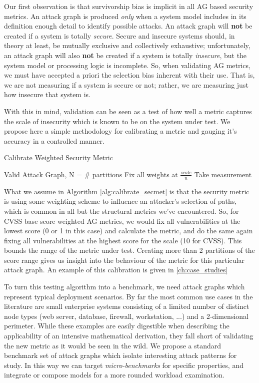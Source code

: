 Our first observation is that survivorship bias\cite{Wald_1980} is implicit in all AG based security metrics. An attack graph is produced \textit{only} when a system model includes in its definition enough detail to identify possible attacks. An attack graph will \textbf{not} be created if a system is totally \textit{secure}. Secure and insecure systems should, in theory at least, be mutually exclusive and collectively exhaustive; unfortunately, an attack graph will also \textbf{not} be created if a system is totally \textit{insecure}, but the system model or processing logic is incomplete. So, when validating AG metrics, we must have accepted a priori the selection bias inherent with their use. That is, we are not measuring if a system is secure or not; rather, we are measuring just how insecure that system is. 

With this in mind, validation can be seen as a test of how well a metric captures the scale of insecurity which is known to be on the system under test. We propose here a simple methodology for calibrating a metric and gauging it's accuracy in a controlled manner. 

\begin{algorithm}
\caption{Calibrate Weighted Security Metric}
\label{alg:calibrate_secmet}
\begin{algorithmic}
\REQUIRE Valid Attack Graph, N = \# partitions
 \STATE Fix all weights at $\frac{scale}{n}$ 
 \STATE Take measurement
\ENDFOR
 \end{algorithmic}
\end{algorithm}

What we assume in Algorithm \ref{alg:calibrate_secmet} is that the security metric is using some weighting scheme to influence an attacker's selection of paths, which is common in all but the structural metrics  we've encountered. So, for CVSS base score weighted AG metrics, we would fix all vulnerabilities at the lowest score (0 or 1 in this case) and calculate the metric, and do the same again fixing all vulnerabilities at the highest score for the scale (10 for CVSS). This bounds the range of the metric under test. Creating more than 2 partitions of the score range gives us insight into the behaviour of the metric for this particular attack graph. An example of this calibration is given in \ref{ch:case_studies}

To turn this testing algorithm into a benchmark, we need attack graphs which represent typical deployment scenarios. By far the most common use cases in the literature are small enterprise systems consisting of a limited number of distinct node types (web server, database, firewall, workstation, ...) and a 2-dimensional perimeter. While these examples are easily digestible when describing the applicability of an intensive mathematical derivation, they fall short of validating the new metric as it would be seen in the wild. We propose a standard benchmark set of attack graphs which isolate interesting attack patterns for study. In this way we can target \textit{micro-benchmarks} for specific properties, and integrate or compose models for a more rounded workload examination.

